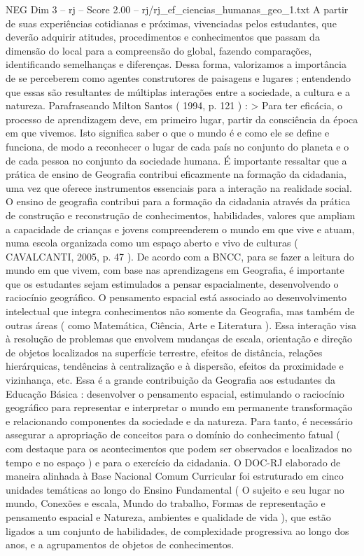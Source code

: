 \begin{textsample}{NEG Dim 3 – rj – Score 2.00 – rj/rj\_ef\_ciencias\_humanas\_geo\_1.txt}
A partir de suas experiências cotidianas e próximas, vivenciadas pelos estudantes, que deverão adquirir atitudes, procedimentos e conhecimentos que passam da dimensão do local para a compreensão do global, fazendo comparações, identificando semelhanças e diferenças.
Dessa forma, valorizamos a importância de se perceberem como agentes construtores de paisagens e lugares ; entendendo que essas são resultantes de múltiplas interações entre a sociedade, a cultura e a natureza.
Parafraseando Milton Santos ( 1994, p. 121 ) : > Para ter eficácia, o processo de aprendizagem deve, em primeiro lugar, partir da consciência da época em que vivemos.
Isto significa saber o que o mundo é e como ele se define e funciona, de modo a reconhecer o lugar de cada país no conjunto do planeta e o de cada pessoa no conjunto da sociedade humana.
É importante ressaltar que a prática de ensino de Geografia contribui eficazmente na formação da cidadania, uma vez que oferece instrumentos essenciais para a interação na realidade social.
O ensino de geografia contribui para a formação da cidadania através da prática de construção e reconstrução de conhecimentos, habilidades, valores que ampliam a capacidade de crianças e jovens compreenderem o mundo em que vive e atuam, numa escola organizada como um espaço aberto e vivo de culturas ( CAVALCANTI, 2005, p. 47 ).
De acordo com a BNCC, para se fazer a leitura do mundo em que vivem, com base nas aprendizagens em Geografia, é importante que os estudantes sejam estimulados a pensar espacialmente, desenvolvendo o raciocínio geográfico.
O pensamento espacial está associado ao desenvolvimento intelectual que integra conhecimentos não somente da Geografia, mas também de outras áreas ( como Matemática, Ciência, Arte e Literatura ).
Essa interação visa à resolução de problemas que envolvem mudanças de escala, orientação e direção de objetos localizados na superfície terrestre, efeitos de distância, relações hierárquicas, tendências à centralização e à dispersão, efeitos da proximidade e vizinhança, etc.
Essa é a grande contribuição da Geografia aos estudantes da Educação Básica : desenvolver o pensamento espacial, estimulando o raciocínio geográfico para representar e interpretar o mundo em permanente transformação e relacionando componentes da sociedade e da natureza.
Para tanto, é necessário assegurar a apropriação de conceitos para o domínio do conhecimento fatual ( com destaque para os acontecimentos que podem ser observados e localizados no tempo e no espaço ) e para o exercício da cidadania.
O DOC-RJ elaborado de maneira alinhada à Base Nacional Comum Curricular foi estruturado em cinco unidades temáticas ao longo do Ensino Fundamental ( O sujeito e seu lugar no mundo, Conexões e escala, Mundo do trabalho, Formas de representação e pensamento espacial e Natureza, ambientes e qualidade de vida ), que estão ligados a um conjunto de habilidades, de complexidade progressiva ao longo dos anos, e a agrupamentos de objetos de conhecimentos.

\end{textsample}
